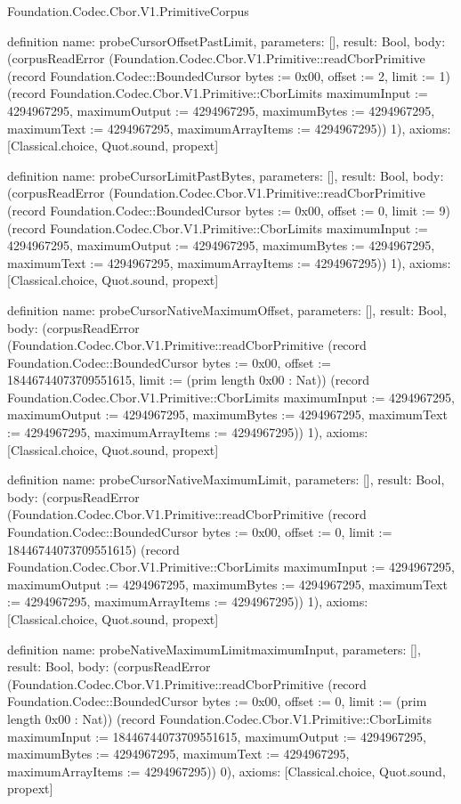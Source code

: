 \begin{lexlean}{Foundation.Codec.Cbor.V1.PrimitiveCorpus}
\begin{semanticmodule}
definition{
  name: probeCursorOffsetPastLimit,
  parameters: [],
  result: Bool,
  body: (corpusReadError (Foundation.Codec.Cbor.V1.Primitive::readCborPrimitive (record Foundation.Codec::BoundedCursor {bytes := 0x00, offset := 2, limit := 1}) (record Foundation.Codec.Cbor.V1.Primitive::CborLimits {maximumInput := 4294967295, maximumOutput := 4294967295, maximumBytes := 4294967295, maximumText := 4294967295, maximumArrayItems := 4294967295})) 1),
  axioms: [Classical.choice, Quot.sound, propext]
}

definition{
  name: probeCursorLimitPastBytes,
  parameters: [],
  result: Bool,
  body: (corpusReadError (Foundation.Codec.Cbor.V1.Primitive::readCborPrimitive (record Foundation.Codec::BoundedCursor {bytes := 0x00, offset := 0, limit := 9}) (record Foundation.Codec.Cbor.V1.Primitive::CborLimits {maximumInput := 4294967295, maximumOutput := 4294967295, maximumBytes := 4294967295, maximumText := 4294967295, maximumArrayItems := 4294967295})) 1),
  axioms: [Classical.choice, Quot.sound, propext]
}

definition{
  name: probeCursorNativeMaximumOffset,
  parameters: [],
  result: Bool,
  body: (corpusReadError (Foundation.Codec.Cbor.V1.Primitive::readCborPrimitive (record Foundation.Codec::BoundedCursor {bytes := 0x00, offset := 18446744073709551615, limit := (prim length 0x00 : Nat)}) (record Foundation.Codec.Cbor.V1.Primitive::CborLimits {maximumInput := 4294967295, maximumOutput := 4294967295, maximumBytes := 4294967295, maximumText := 4294967295, maximumArrayItems := 4294967295})) 1),
  axioms: [Classical.choice, Quot.sound, propext]
}

definition{
  name: probeCursorNativeMaximumLimit,
  parameters: [],
  result: Bool,
  body: (corpusReadError (Foundation.Codec.Cbor.V1.Primitive::readCborPrimitive (record Foundation.Codec::BoundedCursor {bytes := 0x00, offset := 0, limit := 18446744073709551615}) (record Foundation.Codec.Cbor.V1.Primitive::CborLimits {maximumInput := 4294967295, maximumOutput := 4294967295, maximumBytes := 4294967295, maximumText := 4294967295, maximumArrayItems := 4294967295})) 1),
  axioms: [Classical.choice, Quot.sound, propext]
}

definition{
  name: probeNativeMaximumLimitmaximumInput,
  parameters: [],
  result: Bool,
  body: (corpusReadError (Foundation.Codec.Cbor.V1.Primitive::readCborPrimitive (record Foundation.Codec::BoundedCursor {bytes := 0x00, offset := 0, limit := (prim length 0x00 : Nat)}) (record Foundation.Codec.Cbor.V1.Primitive::CborLimits {maximumInput := 18446744073709551615, maximumOutput := 4294967295, maximumBytes := 4294967295, maximumText := 4294967295, maximumArrayItems := 4294967295})) 0),
  axioms: [Classical.choice, Quot.sound, propext]
}


\end{semanticmodule}
\end{lexlean}
